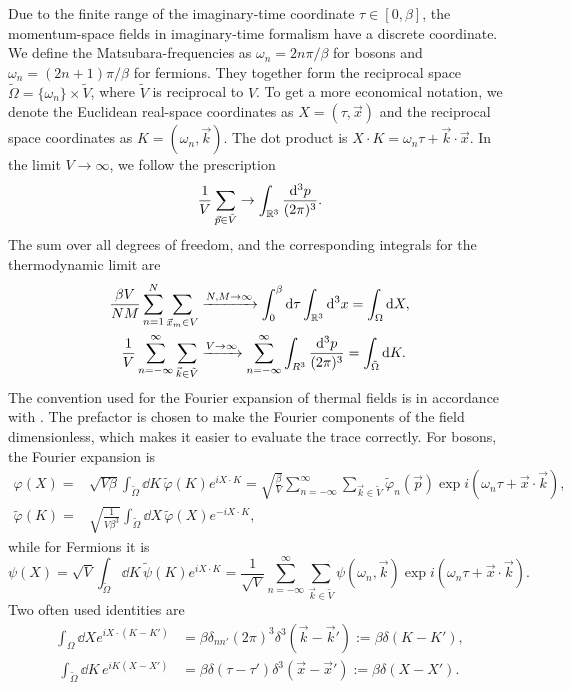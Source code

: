 Due to the finite range of the imaginary-time coordinate $\tau \in [0, \beta]$, the momentum-space fields in imaginary-time formalism have a discrete coordinate. 
We define the Matsubara-frequencies as $\omega_n = 2 n \pi / \beta$ for bosons and $\omega_n = (2n + 1) \pi / \beta$ for fermions.
They together form the reciprocal space $\tilde \Omega = \{\omega_n\}\times \tilde V$, where $\tilde V$ is reciprocal to $V$.
To get a more economical notation, we denote the Euclidean real-space coordinates as $X = (\tau, \vec x)$ and the reciprocal space coordinates as $K = (\omega_n, \vec k)$.
The dot product is $X\cdot K = \omega_n \tau + \vec k \cdot \vec x$.
In the limit $V\rightarrow \infty$, we follow the prescription
\begin{equation*}
    \frac{1}{V} \sum_{\vec p \in \tilde V} \rightarrow \int_{\mathbb{R}^3} 
    \frac{\dd^3 p}{(2 \pi)^3}.
\end{equation*}
The sum over all degrees of freedom, and the corresponding integrals for the thermodynamic limit are
\begin{align*}
     \frac{\beta V}{NM}\sum_{n=1}^N \sum_{\vec x_m \in V} 
    & \xrightarrow{N,M\rightarrow \infty} \int_{0}^\beta \dd \tau \int_{\mathbb{R}^3} \dd^3 x
    = \int_\Omega \dd X, \\
     \frac{1}{V} \sum_{n=-\infty}^\infty \sum_{\vec k \in \tilde V}
    & \xrightarrow{V \rightarrow \infty} \sum_{n=-\infty}^\infty \int_{R^3} \frac{\dd^3 p}{(2 \pi)^3}
    = \int_{\tilde \Omega} \dd K.
\end{align*}
The convention used for the Fourier expansion of thermal fields is in accordance with \cite{Kapusta:finiteTemp}. 
The prefactor is chosen to make the Fourier components of the field dimensionless, which makes it easier to evaluate the trace correctly.
For bosons, the Fourier expansion is
\begin{align*}
    \varphi(X)
    = &
    \sqrt{V \beta} \int_{\tilde \Omega} \dd K \,  \tilde \varphi(K) e^{i X\cdot K}
    =
    \sqrt{\frac{\beta}{V}} \sum_{n=-\infty}^\infty \sum_{\vec k \in \tilde V}
    \tilde \varphi_n(\vec p) \exp{i(\omega_n \tau + \vec x \cdot \vec k)}, \\
    \tilde \varphi(K)
    = &
    \sqrt{\frac{1}{V \beta^3}} \int_{\tilde \Omega} \dd X \,  \tilde \varphi(X) e^{ - i X\cdot K},
\end{align*}
while for Fermions it is
\begin{equation}
    \psi(X) 
    = \sqrt{V} \int_{\tilde \Omega} \dd K \, \tilde \psi(K) e^{i X\cdot K} 
    = \frac{1}{\sqrt{V}} \sum_{n = - \infty}^\infty \sum_{\vec k \in \tilde V}
    \psi(\omega_n, \vec k) \exp{i(\omega_n \tau + \vec x \cdot \vec k)}.
\end{equation}
Two often used identities are
\begin{align}
    \label{thermal delta}
    \int_{\Omega} \dd X e^{i X\cdot(K - K')} 
    & = \beta \delta_{nn'} (2 \pi)^3 \delta^3(\vec k - \vec k') := \beta \delta(K - K'), \\\
    \int_{\tilde \Omega} \dd K \, e^{i K(X - X')} 
    & = \beta \delta (\tau - \tau') \delta^3(\vec x - \vec x') 
    := \beta \delta(X - X').
\end{align}
